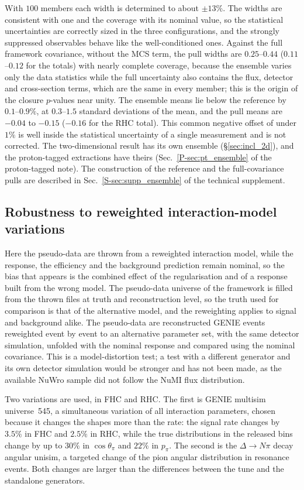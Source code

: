 \documentclass[11pt,a4paper]{article}
\newcommand{\suppref}[2]{#1~\ref{S-#2} of the technical supplement}
\newcommand{\ptref}[2]{#1~\ref{P-#2} of the proton-tagged note}
\begin{document}
With $100$ members each width is determined to about $\pm13\%$. The widths are consistent with one
and the coverage with its nominal value, so the statistical uncertainties are correctly sized in the
three configurations, and the strongly suppressed observables behave like the well-conditioned
ones. Against the full framework covariance, without the MCS term, the pull widths are $0.25$--$0.44$ ($0.11$--$0.12$ for the totals) with
nearly complete coverage, because the ensemble varies only the data statistics while the full
uncertainty also contains the flux, detector and cross-section terms, which are the same in every
member; this is the origin of the closure $p$-values near unity. The ensemble means lie below the
reference by $0.1$--$0.9\%$, at $0.3$--$1.5$ standard deviations of the mean, and the pull means are $-0.04$ to $-0.15$ ($-0.16$ for the RHC
total). This common negative offset of under $1\%$ is well inside the statistical uncertainty of a single
measurement and is not corrected. The two-dimensional result has its own ensemble
(\S\ref{sec:incl_2d}), and the proton-tagged extractions have theirs (\ptref{Sec.}{sec:pt_ensemble}). The construction of the reference and the full-covariance pulls are described in
\suppref{Sec.}{sec:supp_ensemble}.

\subsection{Robustness to reweighted interaction-model variations}
\label{sec:altmodel}

Here the pseudo-data are thrown from a reweighted interaction model, while the response, the
efficiency and the background prediction remain nominal, so the bias that appears is the combined
effect of the regularisation and of a response built from the wrong model. The pseudo-data universe
of the framework is filled from the thrown files at truth and reconstruction level, so the truth
used for comparison is that of the alternative model, and the reweighting applies to signal and
background alike. The pseudo-data are reconstructed GENIE events reweighted event by event to an
alternative parameter set, with the same detector simulation, unfolded with the nominal response and
compared using the nominal covariance. This is a model-distortion test; a test with a different
generator and its own detector simulation would be stronger and has not been made, as the available NuWro sample did not follow the NuMI flux distribution. 

Two variations are used, in FHC and RHC. The first is GENIE multisim universe~545, a simultaneous
variation of all interaction parameters, chosen because it changes the shapes more than the rate:
the signal rate changes by $3.5\%$ in FHC and $2.5\%$ in RHC, while the true distributions in the released
bins change by up to $30\%$ in $\cos\theta_\pi$ and $22\%$ in $p_\pi$. The second is the $\Delta\to N\pi$ decay angular unisim, a
targeted change of the pion angular distribution in resonance events. Both changes are larger than
the differences between the tune and the standalone generators.
\end{document}
